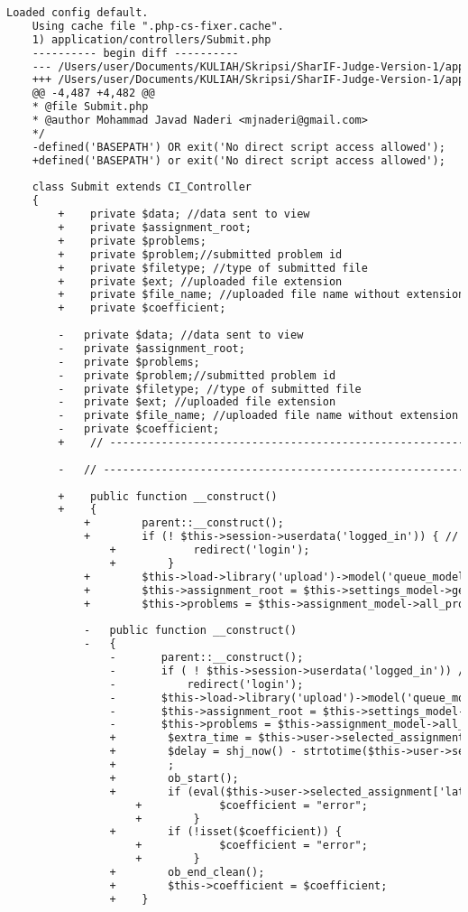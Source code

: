 \begin{lstlisting}[language=diff, caption=Perubahan pada kode Submit.php]
	Loaded config default.
	Using cache file ".php-cs-fixer.cache".
	1) application/controllers/Submit.php
	---------- begin diff ----------
	--- /Users/user/Documents/KULIAH/Skripsi/SharIF-Judge-Version-1/application/controllers/Submit.php
	+++ /Users/user/Documents/KULIAH/Skripsi/SharIF-Judge-Version-1/application/controllers/Submit.php
	@@ -4,487 +4,482 @@
	* @file Submit.php
	* @author Mohammad Javad Naderi <mjnaderi@gmail.com>
	*/
	-defined('BASEPATH') OR exit('No direct script access allowed');
	+defined('BASEPATH') or exit('No direct script access allowed');
	
	class Submit extends CI_Controller
	{
		+    private $data; //data sent to view
		+    private $assignment_root;
		+    private $problems;
		+    private $problem;//submitted problem id
		+    private $filetype; //type of submitted file
		+    private $ext; //uploaded file extension
		+    private $file_name; //uploaded file name without extension
		+    private $coefficient;
		
		-	private $data; //data sent to view
		-	private $assignment_root;
		-	private $problems;
		-	private $problem;//submitted problem id
		-	private $filetype; //type of submitted file
		-	private $ext; //uploaded file extension
		-	private $file_name; //uploaded file name without extension
		-	private $coefficient;
		+    // ------------------------------------------------------------------------
		
		-	// ------------------------------------------------------------------------
		
		+    public function __construct()
		+    {
			+        parent::__construct();
			+        if (! $this->session->userdata('logged_in')) { // if not logged in
				+            redirect('login');
				+        }
			+        $this->load->library('upload')->model('queue_model');
			+        $this->assignment_root = $this->settings_model->get_setting('assignments_root');
			+        $this->problems = $this->assignment_model->all_problems($this->user->selected_assignment['id']);
			
			-	public function __construct()
			-	{
				-		parent::__construct();
				-		if ( ! $this->session->userdata('logged_in')) // if not logged in
				-			redirect('login');
				-		$this->load->library('upload')->model('queue_model');
				-		$this->assignment_root = $this->settings_model->get_setting('assignments_root');
				-		$this->problems = $this->assignment_model->all_problems($this->user->selected_assignment['id']);
				+        $extra_time = $this->user->selected_assignment['extra_time'];
				+        $delay = shj_now() - strtotime($this->user->selected_assignment['finish_time']);
				+        ;
				+        ob_start();
				+        if (eval($this->user->selected_assignment['late_rule']) === false) {
					+            $coefficient = "error";
					+        }
				+        if (!isset($coefficient)) {
					+            $coefficient = "error";
					+        }
				+        ob_end_clean();
				+        $this->coefficient = $coefficient;
				+    }
			

\end{lstlisting}
